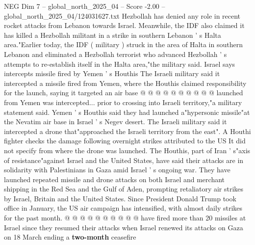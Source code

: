 \begin{textsample}{NEG Dim 7 – global\_north\_2025\_04 – Score -2.00 – global\_north\_2025\_04/124031627.txt}
Hezbollah has denied any role in recent rocket attacks from Lebanon towards Israel.
Meanwhile, the IDF also claimed it has killed a Hezbollah militant in a strike in southern Lebanon ' s Halta area."Earlier today, the IDF ( military ) struck in the area of Halta in southern Lebanon and eliminated a Hezbollah terrorist who advanced Hezbollah ' s attempts to re-establish itself in the Halta area,"the military said.
Israel says intercepts missile fired by Yemen ' s Houthis The Israeli military said it intercepted a missile fired from Yemen, where the Houthis claimed responsibility for the launch, saying it targeted an air base @ @ @ @ @ @ @ @ @ @ launched from Yemen was intercepted... prior to crossing into Israeli territory,"a military statement said.
Yemen ' s Houthis said they had launched a"hypersonic missile"at the Nevatim air base in Israel ' s Negev desert.
The Israeli military said it intercepted a drone that"approached the Israeli territory from the east".
A Houthi fighter checks the damage following overnight strikes attributed to the US It did not specify from where the drone was launched.
The Houthis, part of Iran ' s"axis of resistance"against Israel and the United States, have said their attacks are in solidarity with Palestinians in Gaza amid Israel ' s ongoing war.
They have launched repeated missile and drone attacks on both Israel and merchant shipping in the Red Sea and the Gulf of Aden, prompting retaliatory air strikes by Israel, Britain and the United States.
Since President Donald Trump took office in January, the US air campaign has intensified, with almost daily strikes for the past month. @ @ @ @ @ @ @ @ @ @ have fired more than 20 missiles at Israel since they resumed their attacks when Israel renewed its attacks on Gaza on 18 March ending a \textbf{two-month} ceasefire

\end{textsample}
